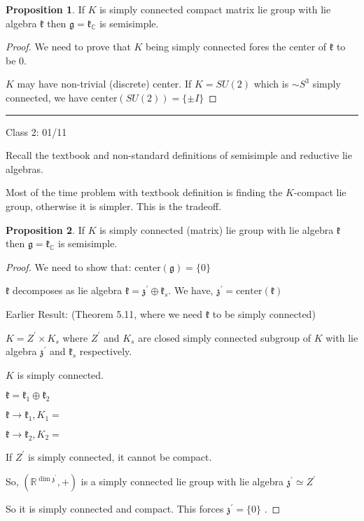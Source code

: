 \documentclass{article}
\theoremstyle{definition}
\newtheorem{proposition}{Proposition}
\begin{document}
\begin{proposition}
    If \(K\) is simply connected compact matrix lie group with lie algebra \(\mathfrak{k} \) then \(\mathfrak{g} =\mathfrak{k} _\mathbb{C} \) is semisimple.
\end{proposition}

\begin{proof}
    We need to prove that \(K\) being simply connected fores the center of \(\mathfrak{k} \) to be \(0\).

     \(K\) may have non-trivial (discrete) center. If \(K=SU(2)\) which is \(\sim S^3\) simply connected, we have \(\text{center}(SU(2))=\{\pm I\}\) 
\end{proof}

\hrule
\hfil

Class 2: 01/11

Recall the textbook and non-standard definitions of semisimple and reductive lie algebras.

Most of the time problem with textbook definition is finding the \(K\)-compact lie group, otherwise it is simpler. This is the tradeoff.

\begin{proposition}
    If \(K\) is simply connected (matrix) lie group with lie algebra \(\mathfrak{k} \) then \(\mathfrak{g}  = \mathfrak{k} _\mathbb{C} \) is semisimple.
\end{proposition}

\begin{proof}
    We need to show that: \(\text{center}(\mathfrak{g})=\{ 0 \} \)
    
    \(\mathfrak{k} \) decomposes as lie algebra \(\mathfrak{k} =\mathfrak{z}^{\prime} \oplus \mathfrak{k} _{s} \). We have, \(\mathfrak{z}^{\prime} =\text{center}(\mathfrak{k} )  \)
    
    Earlier Result: (Theorem 5.11, where we need \(\mathfrak{k} \) to be simply connected)

    \(K=Z^{\prime} \times K_{s} \) where \(Z^{\prime} \) and \(K_{s} \) are closed simply connected subgroup of \(K\) with lie algebra \(\mathfrak{z}^{\prime}  \) and \(\mathfrak{k} _{s} \) respectively.

    \(K\) is simply connected.

    \(\mathfrak{k} =\mathfrak{k}_1 \oplus \mathfrak{k}_2\) 

    \(\mathfrak{k} \to \mathfrak{k} _1, K_1 =\)

    \(\mathfrak{k} \to \mathfrak{k} _2, K_2=\) 
    
    If \(Z^{\prime} \) is simply connected, it cannot be compact.

    So, \((\mathbb{R}^{\dim \mathfrak{z}^{\prime} },+)\) is a simply connected lie group with lie algebra \(\mathfrak{z}^\prime \simeq Z^{\prime} \)  

    So it is simply connected and compact. This forces \(\mathfrak{z}^{\prime} =\{ 0 \} \) .

\end{proof}
\end{document}
